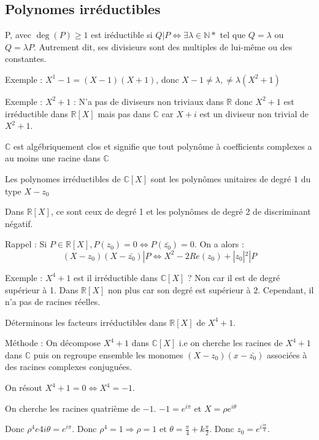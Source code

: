 \documentclass[french]{yLectureNote}
\begin{document}
\subsection{Polynomes irréductibles}
\begin{definition}
P, avec $\deg(P)\geq 1$ est iréductible si $Q|P \iff \exists \lambda \in\mathbb{N} *$ tel que $Q=\lambda$ ou $Q=\lambda P$. Autrement dit, ses divisieurs sont des multiples de lui-m\^eme ou des constantes.
\end{definition}
Exemple : $X^1-1 = (X-1)(X+1)$, donc $X-1\neq \lambda, \neq \lambda(X^2+1)$

Exemple : $X^2+1$ : N'a pas de diviseurs non triviaux dans $\mathbb{R}$ donc $X^2+1$ est irréductible dans $\mathbb{R}[X]$ mais pas dans $\mathbb{C}$ car $X+i$ est un diviseur non trivial de $X^2+1$.
\begin{theorem}
 $\mathbb{C}$ est algébriquement clos et signifie que tout polyn\^ome à coefficients complexes a au moins une racine dans $\mathbb{C}$
\end{theorem}
\begin{theorem}
 Les polynomes irréductibles de $\mathbb{C}[X]$ sont les polyn\^omes unitaires de degré $1$ du type $X-z_0$

Dans $\mathbb{R}[X]$, ce sont ceux de degré 1 et les polyn\^omes de degré 2 de discriminant négatif.
\end{theorem}

Rappel : Si $P\in\mathbb{R}[X], P(z_0)=0\iff P(\bar{z_0}) = 0$. On a alors :
\[(X-z_0)(X-\bar{z_0}) |P \iff X^2-2Re(z_0)+|z_0|^2|P\]

Exemple : $X^4+1$ est il irréductible dans $\mathbb{C}[X]$ ? Non car il est de degré supérieur à 1. Dans $\mathbb{R}[X]$ non plus car son degré est supérieur à $2$. Cependant, il n'a pas de racines réelles.

Déterminons les facteurs irréductibles dans $\mathbb{R}[X]$ de $X^4+1$.

Méthode : On décompose $X^4+1$ dans $\mathbb{C}[X]$ i.e on cherche les racines de $X^4+1$ dans $\mathbb{C}$ puis on regroupe ensemble les monomes $(X-z_0)(x-\bar{z_0})$ associées à des racines complexes conjuguées.

On résout $X^4+1 = 0 \iff X^4=-1$.

On cherche les racines quatrième de $-1$. $-1=e^{i\pi}$ et $X=\rho e^{i\theta}$

Donc $\rho^4e{4i\theta} = e^{i\pi}$. Donc $\rho^4=1 \Rightarrow \rho = 1$ et $\theta = \frac{\pi}{4} + k\frac{\pi}{2}$. Donc $z_0 = e^{i\frac{i\pi}{4}}$.
\end{document}
